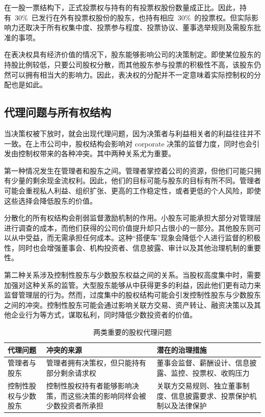 在一股一票结构下，正式投票权与持有的有投票权股份数量成正比。因此，持有~30\%~已发行在外有投票权股份的股东，也持有相应~30\%~的投票权。但实际影响力还取决于所有权集中度、投票参与程度、投票协议、董事选举规则及需股东批准的事项。

在表决权具有经济价值的情况下，股东能够影响公司的决策制定。即使某位股东的持股比例较低，只要公司股权分散，而其他股东参与投票的积极性不高，该股东仍然可以拥有相当大的影响力。因此，表决权的分配并不一定意味着实际控制权的分配也是如此。

\subsection{代理问题与所有权结构}

当决策权被下放时，就会出现代理问题，因为决策者与利益相关者的利益往往并不一致。在上市公司中，股权结构会影响对 corporate 决策的监督力度，同时也会引发由控制权带来的各种冲突。其中两种关系尤为重要。

第一种情况发生在管理者和股东之间。管理者掌控着公司的资源，但他们可能只拥有少量的剩余现金流权利。因此，他们的目标可能与股东的目标有所不同。管理者可能会重视私人利益、组织扩张、更高的工作稳定性，或者更低的个人风险，即使这些选择会降低股东的价值。

分散化的所有权结构会削弱监督激励机制的作用。小股东可能承担大部分对管理层进行调查的成本，而他们获得的公司价值提升却只占很小的一部分。其他股东则可以从中受益，而无需承担任何成本。这种“搭便车”现象会降低个人进行监督的积极性，同时也会增强董事会、机构投资者、信息披露、审计以及其他治理机制的重要性。

第二种关系涉及控制性股东与少数股东权益之间的关系。当股权高度集中时，需要加强对这种关系的监管。大型股东能够从中获得更多的利益，因此他们更有动力来监督管理层的行为。然而，过度集中的股权结构可能会引发控制性股东与少数股东之间的冲突。控制性股东可能会通过影响关联方交易、资产转让、融资决策以及其他企业行为等方式，谋取私利，同时降低少数投资者的价值。


\begin{table}[H]

\centering

\caption{两类重要的股权代理问题}

\label{tab:ch9-agency-problems}

\begin{tabularx}{\textwidth}{@{}p{3.0cm}Y Y@{}}

\toprule

\textbf{代理问题} & \textbf{冲突的来源} & \textbf{潜在的治理措施} \\

\midrule

管理者与股东&管理者拥有决策权，但只能持有部分剩余请求权&董事会监督、薪酬设计、信息披露、监控、投票权、收购压力\\

控制性股权与少数股东
& 控制性股权持有者能够影响决策，而这些决策的影响同样会被少数投资者所承担
& 关联方交易规则、独立董事制度、信息披露要求、投票保护机制以及法律保护 \\

\bottomrule

\end{tabularx}

\end{table}



